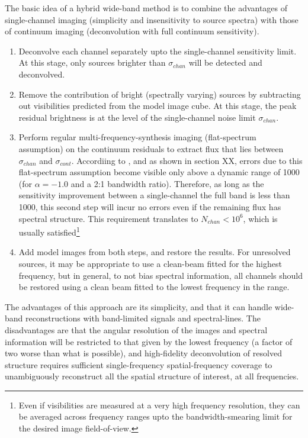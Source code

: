 \documentclass[structabstract]{stylefiles/aa}
\begin{document}
The basic idea of a hybrid wide-band method is to combine 
the advantages of single-channel imaging (simplicity and 
insensitivity to source spectra) with those of continuum imaging 
(deconvolution with full continuum sensitivity).
%
\begin{enumerate}
\item Deconvolve each channel separately upto the single-channel sensitivity limit.
At this stage, only sources brighter than $\sigma_{chan}$ will be detected and deconvolved.
\item Remove the contribution of bright (spectrally varying) sources by subtracting out
visibilities predicted from the model image cube.
At this stage, the peak residual brightness is at the level of the single-channel
noise limit $\sigma_{chan}$. 
\item Perform regular multi-frequency-synthesis imaging (flat-spectrum assumption)
on the continuum residuals to extract flux that lies between $\sigma_{chan}$ and $\sigma_{cont}$.
Accordiing to \citep{CCW_MFCLEAN}, and as shown in section XX, 
errors due to this flat-spectrum assumption become visible only above a dynamic
range of 1000 (for $\alpha=-1.0$ and a 2:1 bandwidth ratio). 
Therefore, as long as the sensitivity improvement between a single-channel
the full band is less than 1000, this second step will incur no errors even if the
remaining flux has spectral structure. 
This requirement translates to $N_{chan}<10^6$, which is usually satisfied\footnote
{Even if visibilities are measured at a very high frequency resolution, they can be
averaged across frequency ranges upto the bandwidth-smearing limit for the
desired image field-of-view. 
}
\item Add model images from both steps, and restore the results. 
For unresolved sources, it may be appropriate to use a clean-beam fitted for
the highest frequency, but in general, to not bias spectral information, all channels
should be restored using a clean beam fitted to the lowest frequency in the range.
\end{enumerate}
The advantages of this approach are its simplicity, and that it can handle wide-band
reconstructions with band-limited signals and spectral-lines.
The disadvantages are that the angular resolution of the images and spectral information 
will be restricted to that given by the lowest frequency (a factor of two worse than what is
possible), and high-fidelity deconvolution of resolved structure
requires sufficient single-frequency spatial-frequency
coverage to unambiguously reconstruct all the spatial structure of interest, at all frequencies.
\end{document}

